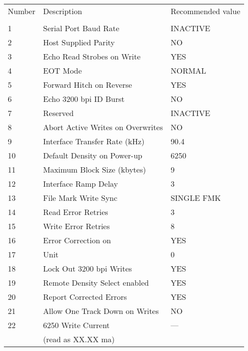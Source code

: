 \begin{center}\begin{tabular}{l@{\hspace{1cm}}l@{\hspace{1cm}}l}

Number 	& Description				& Recommended value \\

&&\\

1	& Serial Port Baud Rate                   & INACTIVE \\
2	& Host Supplied Parity                    & NO \\
3	& Echo Read Strobes on Write              & YES \\
4	& EOT Mode                                & NORMAL \\
5	& Forward Hitch on Reverse                & YES \\
6	& Echo 3200 bpi ID Burst                  & NO \\
7	& Reserved                                & INACTIVE \\
8	& Abort Active Writes on Overwrites       & NO \\
9	& Interface Transfer Rate (kHz)           & 90.4  \\
10	& Default Density on Power-up             & 6250 \\
11	& Maximum Block Size (kbytes)            & 9  \\
12	& Interface Ramp Delay                    & 3  \\
13	& File Mark Write Sync                    & SINGLE  FMK \\
14	& Read Error Retries                      & 3  \\
15	& Write Error Retries                     & 8  \\
16	& Error Correction on                     & YES \\
17	& Unit                                    & 0 \\
18	& Lock Out 3200 bpi Writes                & YES \\
19	& Remote Density Select enabled           & YES \\
20	& Report Corrected Errors                  & YES \\
21	& Allow One Track Down on Writes          & NO  \\
22	& 6250 Write Current                      & --- \\
	& (read as XX.XX  ma) & \\

\end{tabular}
\end{center}
